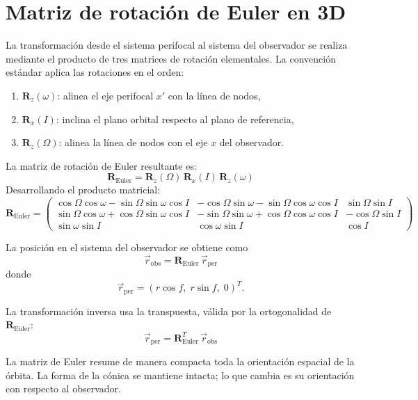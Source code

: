 \section{Matriz de rotación de Euler en 3D}
La transformación desde el sistema perifocal al sistema del observador se realiza mediante el producto de tres matrices de rotación elementales. La convención estándar aplica las rotaciones en el orden:
\begin{enumerate}
    \item \(\mathbf{R}_z(\omega)\): alinea el eje perifocal \(x'\) con la línea de nodos,
    \item \(\mathbf{R}_x(I)\): inclina el plano orbital respecto al plano de referencia,
    \item \(\mathbf{R}_z(\Omega)\): alinea la línea de nodos con el eje \(x\) del observador.
\end{enumerate}

La matriz de rotación de Euler resultante es:
\[
\mathbf{R}_{\text{Euler}} = \mathbf{R}_z(\Omega)\,\mathbf{R}_x(I)\,\mathbf{R}_z(\omega)
\]
Desarrollando el producto matricial:
\[
\mathbf{R}_{\text{Euler}} =
\begin{pmatrix}
\cos\Omega\cos\omega - \sin\Omega\sin\omega\cos I & -\cos\Omega\sin\omega - \sin\Omega\cos\omega\cos I & \sin\Omega\sin I \\
\sin\Omega\cos\omega + \cos\Omega\sin\omega\cos I & -\sin\Omega\sin\omega + \cos\Omega\cos\omega\cos I & -\cos\Omega\sin I \\
\sin\omega\sin I & \cos\omega\sin I & \cos I
\end{pmatrix}
\]

La posición en el sistema del observador se obtiene como
\[
\vec{r}_{\text{obs}} = \mathbf{R}_{\text{Euler}}\,\vec{r}_{\text{per}}
\]
donde
\[
\vec{r}_{\text{per}} = (r\cos f,\; r\sin f,\; 0)^T.
\]

La transformación inversa usa la transpuesta, válida por la ortogonalidad de \(\mathbf{R}_{\text{Euler}}\):
\[
\vec{r}_{\text{per}} = \mathbf{R}_{\text{Euler}}^T\,\vec{r}_{\text{obs}}
\]

\begin{importante}
La matriz de Euler resume de manera compacta toda la orientación espacial de la órbita. La forma de la cónica se mantiene intacta; lo que cambia es su orientación con respecto al observador.
\end{importante}

